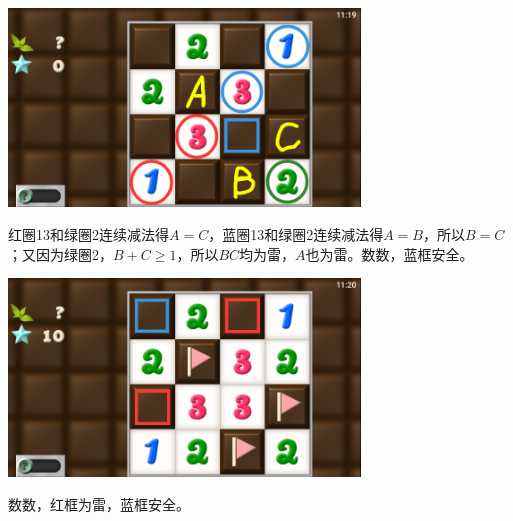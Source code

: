 \subsection{} %
\begin{center}
    \includegraphics[width=0.7\textwidth]{puzzle/163-1.png}
\end{center}
红圈13和绿圈2连续减法得$A=C$，蓝圈13和绿圈2连续减法得$A=B$，所以$B=C$；又因为绿圈2，$B+C\ge 1$，所以$BC$均为雷，$A$也为雷。数数，蓝框安全。
\begin{center}
    \includegraphics[width=0.7\textwidth]{puzzle/163-2.png}
\end{center}
数数，红框为雷，蓝框安全。

